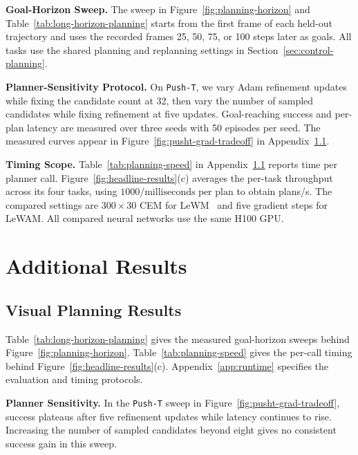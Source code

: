 \documentclass{article} %
\newcommand{\methodname}[1]{\textup{#1}}
\newcommand{\dataset}[1]{\texttt{#1}}
\newcommand{\method}{\methodname{LeWAM}}
\newcommand{\lead}[1]{\textbf{#1}}
\begin{document}
\lead{Goal-Horizon Sweep.} The sweep in Figure~\ref{fig:planning-horizon} and
Table~\ref{tab:long-horizon-planning} starts from the first frame of each held-out
trajectory and uses the recorded frames 25, 50, 75, or 100 steps later as goals.
All tasks use the shared planning and replanning settings in Section~\ref{sec:control-planning}.

\lead{Planner-Sensitivity Protocol.} On \dataset{Push-T}, we vary Adam refinement updates while fixing the candidate count at 32, then vary the number of sampled candidates while fixing refinement at five updates. Goal-reaching success and per-plan latency are measured over three seeds with 50 episodes per seed. The measured curves appear in Figure~\ref{fig:pusht-grad-tradeoff} in Appendix~\ref{app:visual-planning-results}.

\lead{Timing Scope.} Table~\ref{tab:planning-speed} in Appendix~\ref{app:visual-planning-results} reports time per planner call. Figure~\ref{fig:headline-results}(c)
averages the per-task throughput across its four tasks, using
$1000/\text{milliseconds per plan}$ to obtain plans/s. The compared settings are
$300\times30$ CEM for \methodname{LeWM}~\citep{maes2026lewm} and five gradient
steps for \method{}. All compared neural networks use the same H100 GPU.



\FloatBarrier
{}
\section{Additional Results}
\label{app:ablations}
\label{app:numerical-results}
\label{app:additional-results}

\subsection{Visual Planning Results}
\label{app:visual-planning-results}

Table~\ref{tab:long-horizon-planning} gives the measured goal-horizon sweeps behind Figure~\ref{fig:planning-horizon}. Table~\ref{tab:planning-speed} gives the per-call timing behind Figure~\ref{fig:headline-results}(c). Appendix~\ref{app:runtime} specifies the evaluation and timing protocols.





\lead{Planner Sensitivity.} In the \dataset{Push-T} sweep in
Figure~\ref{fig:pusht-grad-tradeoff}, success plateaus after five refinement
updates while latency continues to rise. Increasing the number of sampled
candidates beyond eight gives no consistent success gain in this sweep.
\end{document}
